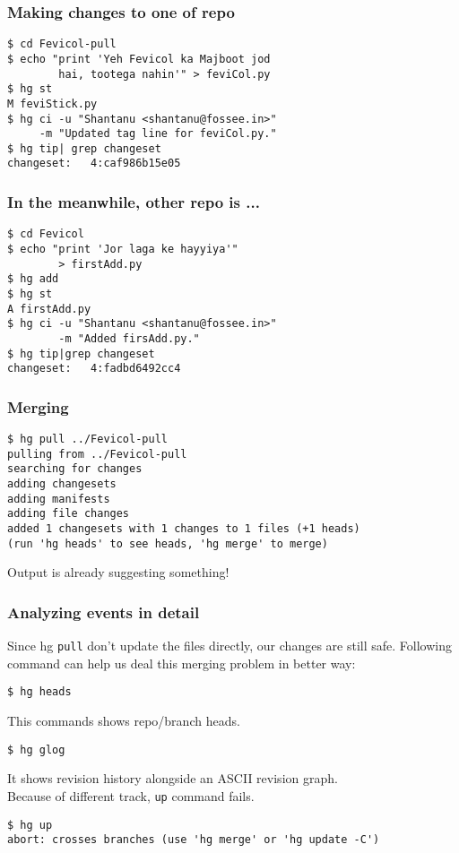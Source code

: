 \documentclass[14pt,compress]{beamer}
\newcommand{\typ}[1]{\lstinline{#1}}
\begin{document}
\begin{frame}[fragile]
  \frametitle{Making changes to one of repo}
  \begin{lstlisting}
$ cd Fevicol-pull
$ echo "print 'Yeh Fevicol ka Majboot jod 
        hai, tootega nahin'" > feviCol.py
$ hg st
M feviStick.py
$ hg ci -u "Shantanu <shantanu@fossee.in>" 
     -m "Updated tag line for feviCol.py."
$ hg tip| grep changeset
changeset:   4:caf986b15e05
  \end{lstlisting} %
\end{frame}

\begin{frame}[fragile]
  \frametitle{In the meanwhile, other repo is ...}
  \begin{lstlisting}
$ cd Fevicol
$ echo "print 'Jor laga ke hayyiya'" 
        > firstAdd.py
$ hg add 
$ hg st
A firstAdd.py
$ hg ci -u "Shantanu <shantanu@fossee.in>"
        -m "Added firsAdd.py."
$ hg tip|grep changeset
changeset:   4:fadbd6492cc4    
  \end{lstlisting}
\end{frame}

\begin{frame}[fragile]
  \frametitle{Merging}
  \begin{lstlisting}
$ hg pull ../Fevicol-pull
pulling from ../Fevicol-pull
searching for changes
adding changesets
adding manifests
adding file changes
added 1 changesets with 1 changes to 1 files (+1 heads)
(run 'hg heads' to see heads, 'hg merge' to merge)    
  \end{lstlisting} %
  Output is already suggesting something!
\end{frame}


\begin{frame}[fragile]
  \frametitle{Analyzing events in detail}
  Since hg \typ{pull} don't update the files directly, our changes are still safe. Following command can help us deal this merging problem in better way:
  \begin{lstlisting}
$ hg heads
  \end{lstlisting}
  This commands shows repo/branch heads.
  \begin{lstlisting}
$ hg glog    
  \end{lstlisting}
  It shows revision history alongside an ASCII revision graph.\\
  Because of different track, \typ{up} command fails.
  \begin{lstlisting}
$ hg up
abort: crosses branches (use 'hg merge' or 'hg update -C')
  \end{lstlisting} %
\end{frame}
\end{document}

